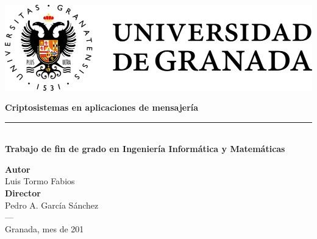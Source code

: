\begin{titlepage}
 
 
\setlength{\centeroffset}{-0.5\oddsidemargin}
\addtolength{\centeroffset}{0.5\evensidemargin}
\thispagestyle{empty}

\noindent\hspace*{\centeroffset}\begin{minipage}{\textwidth}

\centering

 \vspace{3.3cm}

\includegraphics{imagenes/logo.png} 
 \vspace{0.5cm}


{\Huge\bfseries Criptosistemas en aplicaciones de mensajería\\
}
\noindent\rule[-1ex]{\textwidth}{3pt}\\[3.5ex]
{\large\bfseries Trabajo de fin de grado en Ingeniería Informática y Matemáticas\\[4cm]}
\end{minipage}

\vspace{2.5cm}
\noindent\hspace*{\centeroffset}\begin{minipage}{\textwidth}
\centering

\textbf{Autor}\\ {Luis Tormo Fabios}\\[2.5ex]
\textbf{Director}\\
Pedro A. García Sánchez\\
\textsc{---}\\
Granada, mes de 201
\end{minipage}


 
\end{titlepage}


